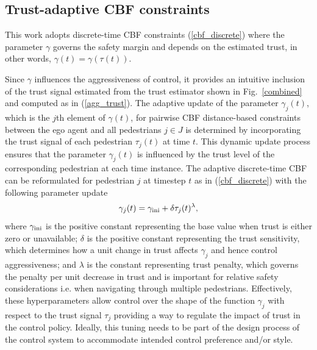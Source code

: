 \documentclass[journal]{IEEEtran}
\begin{document}




\subsection{Trust-adaptive CBF constraints}

This work adopts discrete-time CBF constraints (\ref{cbf_discrete}) where the parameter $\gamma$ governs the safety margin and depends on the estimated trust, in other words, $\gamma(t) = \gamma(\tau(t))$.

Since $\gamma$ influences the aggressiveness of control, it provides an intuitive inclusion of the trust signal estimated from the trust estimator shown in Fig.~\ref{combined} and computed as in (\ref{agg_trust}). The adaptive update of the parameter $\gamma_j(t)$, which is the $j$th element of $\gamma(t)$, for pairwise CBF distance-based constraints between the ego agent and all pedestrians $j \in J$ is determined by incorporating the trust signal of each pedestrian $\tau_j(t)$ at time $t$. This dynamic update process ensures that the parameter $\gamma_j(t)$ is influenced by the trust level of the corresponding pedestrian at each time instance. The adaptive discrete-time CBF can be reformulated for pedestrian $j$ at timestep $t$ as in (\ref{cbf_discrete}) with the following parameter update
\begin{equation}
    \gamma_j(t) =  \gamma_{\rm ini} + \delta \tau_j(t)^{\lambda},
\label{weight}
\end{equation}
where $\gamma_{\rm ini}$ is the positive constant representing the base value when trust is either zero or unavailable; $\delta$ is the positive constant representing the trust sensitivity, which determines how a unit change in trust affects $\gamma_j$ and hence control aggressiveness; and $\lambda$ is the constant representing trust penalty, which governs the penalty per unit decrease in trust and is important for relative safety considerations i.e. when navigating through multiple pedestrians. Effectively, these hyperparameters allow control over the shape of the function $\gamma_j$ with respect to the trust signal $\tau_j$ providing a way to regulate the impact of trust in the control policy. Ideally, this tuning needs to be part of the design
process of the control system to accommodate intended control preference and/or style.
\end{document}
